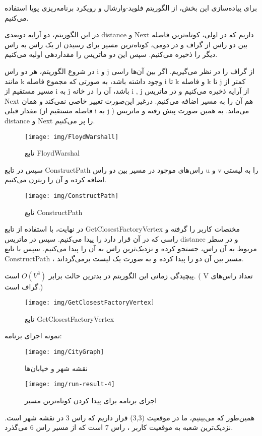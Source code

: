 \documentclass[12pt]{article}
\begin{document}
	برای پیاده‌سازی این بخش، از الگوریتم فلوید-وارشال و رویکرد برنامه‌ریزی پویا استفاده می‌کنیم.

	در این الگوریتم، دو آرایه دوبعدی distance و Next داریم که در اولی، کوتاه‌ترین فاصله بین دو راس از گراف و در دومی، کوتاه‌ترین مسیر برای رسیدن از یک راس به راس دیگر را ذخیره می‌کنیم.
	سپس این دو ماتریس را مقداردهی اولیه می‌کنیم.

	در شروع الگوریتم، هر دو راس i و j از گراف را در نظر می‌گیریم. اگر بین آن‌ها راسی مانند k وجود داشته باشد، به صورتی که مجموع فاصله i تا k و فاصله k تا j کمتر از مسیر مستقیم از i به j باشد، آن را در خانه i , j از آرایه ذخیره می‌کنیم و در ماتریس Next هم آن را به مسیر اضافه می‌کنیم. درغیر این‌صورت تغییر خاصی نمی‌کند و همان مقدار قبلی (فاصله مستقیم از i به j ) می‌ماند. به همین صورت پیش رفته و ماتریس distance و Next را پر می‌کنیم.
	\begin{figure}[H]
		\centering
		\texttt{[image: img/FloydWarshall]}
		\caption{تابع FloydWarshal}
		\label{fig:floydwarshall}
	\end{figure}
	سپس در تابع ConstructPath راس‌های موجود در مسیر بین دو راس u و v را به لیستی اضافه کرده و آن را ریترن می‌کنیم.
	\begin{figure}[H]
		\centering
		\texttt{[image: img/ConstructPath]}
		\caption{تابع ConstructPath}
		\label{fig:constructpath}
	\end{figure}
	در نهایت، با استفاده از تابع GetClosestFactoryVertex مختصات کاربر را گرفته و راسی که در آن قرار دارد را پیدا می‌کنیم. سپس در ماتریس distance و در سطر مربوط به آن راس،‌ جستجو کرده و نزدیک‌ترین راس به آن را پیدا می‌کنیم. سپس با تابع ConstructPath ،‌ مسیر بین آن دو را پیدا کرده و به صورت یک لیست برمی‌گرداند.

	پیچیدگی زمانی این الگوریتم در بدترین حالت برابر
	 $O(V^3)$
	 است. ( V تعداد راس‌های گراف است.)
	\begin{figure}[H]
		\centering
		\texttt{[image: img/GetClosestFactoryVertex]}
		\caption{تابع GetClosestFactoryVertex}
		\label{fig:getclosestfactoryvertex}
	\end{figure}

	نمونه اجرای برنامه:
	\begin{figure}[H]
		\centering
		\texttt{[image: img/CityGraph]}
		\caption{نقشه شهر و خیابان‌ها}
		\label{fig:citygraph}
	\end{figure}
	\begin{figure}[H]
		\centering
		\texttt{[image: img/run-result-4]}
		\caption{اجرای برنامه برای پیدا کردن کوتاه‌ترین مسیر}
		\label{fig:run-result-4}
	\end{figure}
	همین‌طور که می‌بینیم، ما در موقعیت (3,3) قرار داریم که راس 3 در نقشه شهر است.
	نزدیک‌ترین شعبه به موقعیت کاربر ، راس  7 است که از مسیر راس 6 می‌گذرد.
	\newpage
\end{document}
